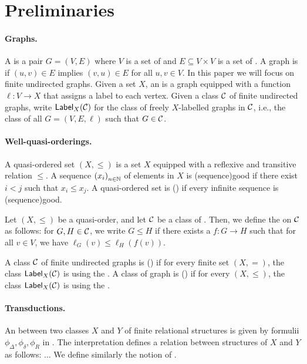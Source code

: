 \section{Preliminaries}
\label{sec:preliminaries}

\paragraph*{Graphs.} A  is a pair $G = (V, E)$ where $V$ is a set
of  and $E \subseteq V \times V$ is a set of . A
graph is  if $(u, v) \in E$ implies $(v, u) \in E$ for all
$u, v \in V$. In this paper we will focus on finite undirected graphs. Given a
set $X$, an  is a graph equipped with a function
$\ell \colon V \to X$ that assigns a label to each vertex. Given a class $\mathcal{C}$
of finite undirected graphs, write $\mathsf{Label}_{X}(\mathcal{C})$ for the class of freely
$X$-labelled graphs in $\mathcal{C}$, i.e., the class of all 
$G = (V, E, \ell)$ such that $G \in \mathcal{C}$.


\paragraph*{Well-quasi-orderings.} A quasi-ordered set $(X, \leq)$ is a set $X$
equipped with a reflexive and transitive relation $\leq$. A sequence
$\seqof{x_i}$ of elements in $X$ is \intro(sequence){good} if there exist $i <
j$ such that $x_i \leq x_j$. A quasi-ordered set is 
() if every infinite sequence is \kl(sequence){good}.

\AP
Let $(X, \leq)$ be a quasi-order, and let $\mathcal{C}$ be a class of . Then, we define the  on $\mathcal{C}$ as
follows: for $G, H \in \mathcal{C}$, we write $G \leq H$ if there exists a
 $f \colon G \to H$ such that for all $v \in V$, we have
$\ell_G(v) \leq \ell_H(f(v))$. 

\AP
A class $\mathcal{C}$ of finite undirected graphs is
 () if for every finite set
$(X,=)$, the class $\mathsf{Label}_{X}(\mathcal{C})$ is  using the
. A class of graph is
 () if for every 
$(X, \leq)$, the class $\mathsf{Label}_{X}(\mathcal{C})$ is  using the
.

\paragraph*{Transductions.} An  between two
classes $X$ and $Y$ of finite relational structures is given by formulii
$\phi_{\Delta}, \phi_{\delta}, \phi_{R}$ in .
The interpretation defines a relation between structures of $X$ and $Y$ as
follows: ... We define similarly the notion of .

